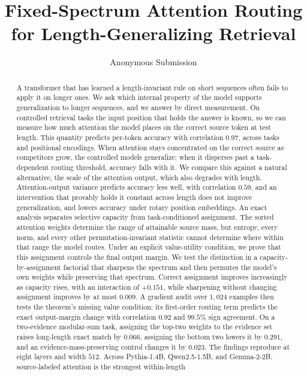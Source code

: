 \documentclass[letterpaper]{article} %
\title{Fixed-Spectrum Attention Routing for Length-Generalizing Retrieval}
\author{
    Anonymous Submission
}
\begin{document}
\maketitle

\begin{abstract}
A transformer that has learned a length-invariant rule on short sequences often fails to apply it on
longer ones.
We ask which internal property of the model supports generalization to longer sequences, and we answer
by direct measurement.
On controlled retrieval tasks the input position that holds the answer is known, so we can measure how
much attention the model places on the correct source token at test length.
This quantity predicts per-token accuracy with correlation $0.97$, across tasks and positional encodings.
When attention stays concentrated on the correct source as competitors grow, the controlled models
generalize; when it disperses past a task-dependent routing threshold, accuracy falls with it.
We compare this against a natural alternative, the scale of the attention output, which also degrades with
length.
Attention-output variance predicts accuracy less well, with correlation $0.59$, and an intervention that
provably holds it constant across length does not improve generalization, and lowers accuracy under rotary
position embeddings.
An exact analysis separates selective capacity from task-conditioned assignment.
The sorted attention weights determine the range of attainable source mass, but entropy, every norm, and
every other permutation-invariant statistic cannot determine where within that range the model routes.
Under an explicit value-utility condition, we prove that this assignment controls the final output margin.
We test the distinction in a capacity-by-assignment factorial that sharpens the spectrum and then permutes
the model's own weights while preserving that spectrum.
Correct assignment improves increasingly as capacity rises, with an interaction of $+0.151$, while
sharpening without changing assignment improves by at most $0.009$.
A gradient audit over $1{,}024$ examples then tests the theorem's missing value condition: its first-order
routing term predicts the exact output-margin change with correlation $0.92$ and $99.5\%$ sign agreement.
On a two-evidence modular-sum task, assigning the top-two weights to the evidence set raises long-length
exact match by $0.066$, assigning the bottom two lowers it by $0.291$, and an evidence-mass-preserving
control changes it by $0.023$.
The findings reproduce at eight layers and width $512$.
Across Pythia-1.4B, Qwen2.5-1.5B, and Gemma-2-2B, source-labeled attention is the strongest within-length

\end{abstract}
\end{document}
